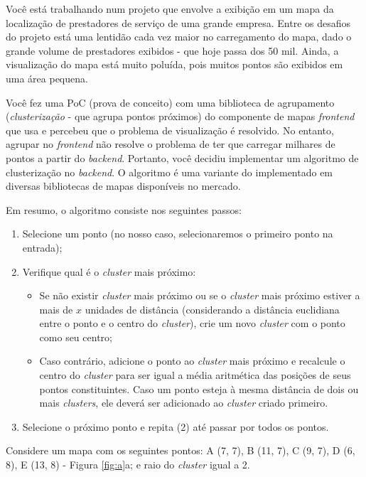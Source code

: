 
Você está trabalhando num projeto que envolve a exibição em um mapa da localização de prestadores de serviço de uma grande empresa. Entre os desafios do projeto está uma lentidão cada vez maior no carregamento do mapa, dado o grande volume de prestadores exibidos - que hoje passa dos 50 mil. Ainda, a visualização do mapa está muito poluída, pois muitos pontos são exibidos em uma área pequena.

Você fez uma PoC (prova de conceito) com uma biblioteca de agrupamento (\textit{clusterização} - que agrupa pontos próximos) do componente de mapas \textit{frontend} que usa e percebeu que o problema de visualização é resolvido. No entanto, agrupar no \textit{frontend} não resolve o problema de ter que carregar milhares de pontos a partir do \textit{backend}. Portanto, você decidiu implementar um algoritmo de clusterização no \textit{backend}. O algoritmo é uma variante do implementado em diversas bibliotecas de mapas disponíveis no mercado.

Em resumo, o algoritmo consiste nos seguintes passos:
\begin{enumerate}
\item Selecione um ponto (no nosso caso, selecionaremos o primeiro ponto na entrada);
\item Verifique qual é o \textit{cluster} mais próximo:
    \begin{itemize}
        \item Se não existir \textit{cluster} mais próximo ou se o \textit{cluster} mais próximo estiver a mais de $x$ unidades de distância (considerando a distância euclidiana entre o ponto e o centro do \textit{cluster}), crie um novo \textit{cluster} com o ponto como seu centro;
        \item Caso contrário, adicione o ponto ao \textit{cluster} mais próximo e recalcule o centro do \textit{cluster} para ser igual a média aritmética das posições de seus pontos constituintes. Caso um ponto esteja à mesma distância de dois ou mais \textit{clusters}, ele deverá ser adicionado ao \textit{cluster} criado primeiro.
    \end{itemize}
\item Selecione o próximo ponto e repita (2) até passar por todos os pontos.
\end{enumerate}

Considere um mapa com os seguintes pontos:
A (7, 7), B (11, 7), C (9, 7), D (6, 8), E (13, 8) - Figura \ref{fig:a}a; e raio do \textit{cluster} igual a 2.


